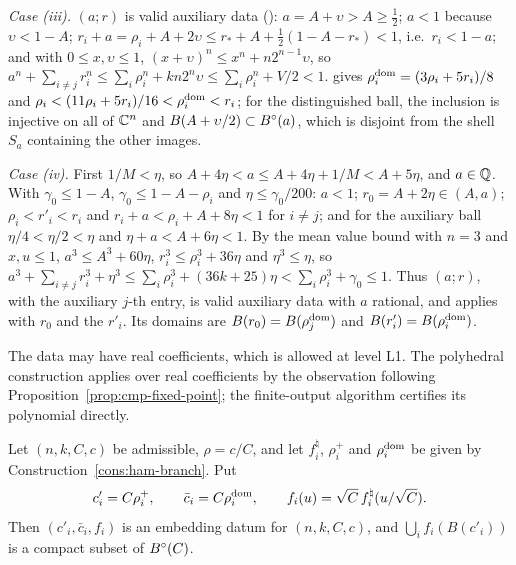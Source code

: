 \emph{Case (iii).} $(a;r)$ is valid auxiliary data (): $a=A+\upsilon >A\ge\frac12$; $a<1$ because
$\upsilon<1-A$; $r_i+a=\rho_i+A+2\upsilon \le r_*+A+\frac12(1-A-r_*)<1$, i.e.\ $r_i<1-a$; and with $0\le x,\upsilon \le1$,
$(x+\upsilon)^n\le x^n+n2^{n-1}\upsilon$, so $a^n+\sum_{i\ne j}r_i^n\le\sum_i\rho_i^n+kn2^n\upsilon\le\sum_i\rho_i^n+V/2<1$. 
gives $\rho_i^{\rm dom}=(3\rho_i+5r_i)/8$ and $\rho_i<(11\rho_i+5r_i)/16<\rho_i^{\rm dom}<r_i$; for the distinguished ball, the inclusion
is injective on all of $\mathbb{C}^n$ and $B(A+\upsilon/2)\subset B^{\circ}(a)$, which is disjoint from the shell $S_a$ containing the other images.

\emph{Case (iv).} First $1/M<\eta$, so $A+4\eta<a\le A+4\eta+1/M<A+5\eta$, and $a\in\mathbb{Q}$. With $\gamma_0\le1-A$,
$\gamma_0\le1-A-\rho_i$ and $\eta\le\gamma_0/200$: $a<1$; $r_0=A+2\eta\in(A,a)$; $\rho_i<r'_i<r_i$ and
$r_i+a<\rho_i+A+8\eta<1$ for $i\ne j$; and for the auxiliary ball $\eta/4<\eta/2<\eta$ and $\eta+a<A+6\eta<1$. By the mean value
bound with $n=3$ and $x,u\le1$, $a^3\le A^3+60\eta$, $r_i^3\le\rho_i^3+36\eta$ and $\eta^3\le\eta$, so
$a^3+\sum_{i\ne j}r_i^3+\eta^3\le\sum_i\rho_i^3+(36k+25)\eta<\sum_i\rho_i^3+\gamma_0\le1$. Thus $(a;r)$, with the auxiliary $j$-th
entry, is valid auxiliary data with $a$ rational, and  applies with $r_0$ and the $r'_i$. Its
domains are $B(r_0)=B(\rho_j^{\rm dom})$ and $B(r'_i)=B(\rho_i^{\rm dom})$.

The data may have real coefficients, which is allowed at level L1. The polyhedral construction applies over real
coefficients by the observation following Proposition~\ref{prop:cmp-fixed-point}; the finite-output algorithm certifies
its polynomial directly.

\begin{proposition}\label{prop:ham-embeddings}
Let $(n,k,C,c)$ be admissible, $\rho=c/C$, and let $f^\natural_i$, $\rho_i^+$ and $\rho_i^{\rm dom}$ be given by
Construction~\ref{cons:ham-branch}. Put
\[
 c'_i=C\rho_i^+,\qquad \bar c_i=C\rho_i^{\rm dom},\qquad f_i(u)=\sqrt C\,f^\natural_i(u/\sqrt C).
\]
Then $(c'_i,\bar c_i,f_i)$ is an embedding datum for $(n,k,C,c)$, and $\bigcup_if_i(B(c'_i))$ is a compact subset of
$B^{\circ}(C)$.
\end{proposition}

